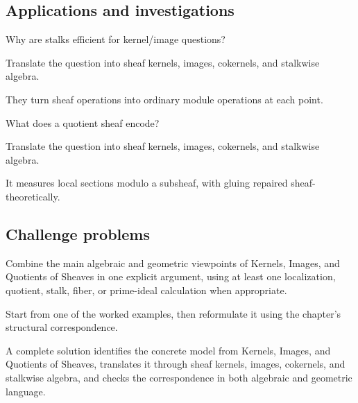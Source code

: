 \subsection*{Applications and investigations}

\begin{exercise}\label{exr:vi15-expand-13}
Why are stalks efficient for kernel/image questions?
\end{exercise}
\begin{hint}
Translate the question into sheaf kernels, images, cokernels, and stalkwise algebra.
\end{hint}
\begin{solution}
They turn sheaf operations into ordinary module operations at each point.
\end{solution}

\begin{exercise}\label{exr:vi15-expand-14}
What does a quotient sheaf encode?
\end{exercise}
\begin{hint}
Translate the question into sheaf kernels, images, cokernels, and stalkwise algebra.
\end{hint}
\begin{solution}
It measures local sections modulo a subsheaf, with gluing repaired sheaf-theoretically.
\end{solution}

\subsection*{Challenge problems}

\begin{exercise}\label{exr:vi15-expand-15}
Combine the main algebraic and geometric viewpoints of Kernels, Images, and Quotients of Sheaves in one explicit argument, using at least one localization, quotient, stalk, fiber, or prime-ideal calculation when appropriate.
\end{exercise}
\begin{hint}
Start from one of the worked examples, then reformulate it using the chapter's structural correspondence.
\end{hint}
\begin{solution}
A complete solution identifies the concrete model from Kernels, Images, and Quotients of Sheaves, translates it through sheaf kernels, images, cokernels, and stalkwise algebra, and checks the correspondence in both algebraic and geometric language.
\end{solution}

